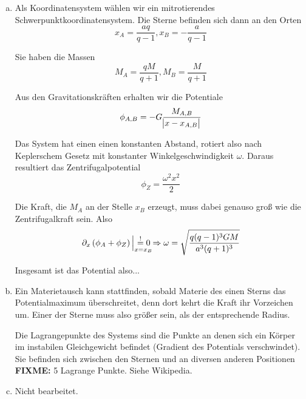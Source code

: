 \documentclass[a4paper,german,12pt,smallheadings]{scrartcl}
\begin{document}
\begin{enumerate}[a)]
  \item
    Als Koordinatensystem wählen wir ein mitrotierendes
    Schwerpunktkoordinatensystem. Die Sterne befinden sich dann an den Orten
    \begin{equation}
      x_A = \frac{aq}{q-1}, x_B = -\frac{a}{q-1}
    \end{equation}

    Sie haben die Massen
    \begin{equation}
      M_A = \frac{qM}{q+1}, M_B = \frac{M}{q+1}
    \end{equation}

    Aus den Gravitationskräften erhalten wir die Potentiale
    \begin{equation}
      \phi_{A,B} = -G \frac{M_{A,B}}{\envert{x - x_{A,B}}}
    \end{equation}

    Das System hat einen einen konstanten Abstand, rotiert also nach
    Keplerschem Gesetz mit konstanter Winkelgeschwindigkeit $\omega$. Daraus
    resultiert das Zentrifugalpotential
    \begin{equation}
      \phi_Z = \frac{\omega^2 x^2}{2}
    \end{equation}

    Die Kraft, die $M_A$ an der Stelle $x_B$ erzeugt, muss dabei genauso groß
    wie die Zentrifugalkraft sein. Also
    \begin{equation}
      \partial_x \del{\phi_A + \phi_Z} \sVert[2]_{\mathrlap{x=x_B}} \overset{!}{=} 0 \Rightarrow \omega = \sqrt{\frac{q(q-1)^3 GM}{a^3(q+1)^3}}
    \end{equation}

    Insgesamt ist das Potential also...

  \item
    Ein Materietausch kann stattfinden, sobald Materie des einen Sterns das
    Potentialmaximum überschreitet, denn dort kehrt die Kraft ihr Vorzeichen
    um. Einer der Sterne muss also größer sein, als der entsprechende Radius.

    Die Lagrangepunkte des Systems sind die Punkte an denen sich ein Körper im
    instabilen Gleichgewicht befindet (Gradient des Potentials verschwindet).
    Sie befinden sich zwischen den Sternen und an diversen anderen Positionen
    \textbf{FIXME:} 5 Lagrange Punkte. Siehe Wikipedia.
  \item
    Nicht bearbeitet.
\end{enumerate}
\end{document}
